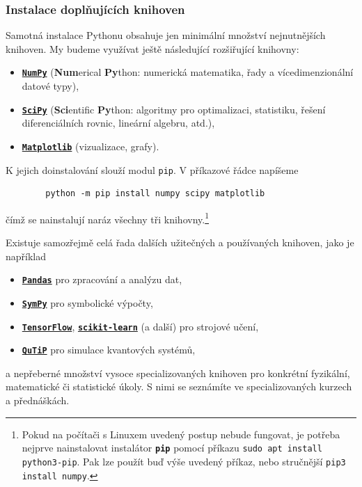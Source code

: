 \documentclass[a4paper,11pt,twoside]{article}
\def\code#1{\textnormal{\texttt{#1}}}
\def\file#1{\textnormal{\textbf{\texttt{#1}}}}
\theoremstyle{red}
\theoremstyle{green}
\begin{document}
\subsubsection{Instalace doplňujících knihoven}
\label{sec:pip}
    Samotná instalace Pythonu obsahuje jen minimální množství nejnutnějších knihoven.
    My budeme využívat ještě následující rozšiřující knihovny:
    \begin{itemize}
        \item \file{\href{https://numpy.org}{NumPy}} ({\bf Num}erical {\bf Py}thon: numerická matematika, řady a vícedimenzionální datové typy),
        \item \file{\href{https://scipy.org}{SciPy}} ({\bf Sci}entific {\bf Py}thon: algoritmy pro optimalizaci, statistiku, řešení diferenciálních rovnic, lineární algebru, atd.),
        \item \file{\href{https://matplotlib.org}{Matplotlib}} (vizualizace, grafy).
    \end{itemize}
    K jejich doinstalování slouží modul \code{pip}.
    V příkazové řádce napíšeme
    \begin{lstlisting}
        python -m pip install numpy scipy matplotlib\end{lstlisting}
    čímž se nainstalují naráz všechny tři knihovny.\footnote{
        Pokud na počítači s Linuxem uvedený postup nebude fungovat, je potřeba nejprve nainstalovat instalátor \file{pip} pomocí příkazu \code{sudo apt install python3-pip}.
        Pak lze použít buď výše uvedený příkaz, nebo stručnější \code{pip3 install numpy}.
    }
    
    Existuje samozřejmě celá řada dalších užitečných a používaných knihoven, jako je například 
    \begin{itemize}
        \item \file{\href{https://pandas.pydata.org/}{Pandas}} pro zpracování a analýzu dat,
        \item \file{\href{https://www.sympy.org/}{SymPy}} pro symbolické výpočty,
        \item \file{\href{https://www.tensorflow.org/}{TensorFlow}}, 
            \file{\href{https://scikit-learn.org}{scikit-learn}} (a další) pro strojové učení,
        \item \file{\href{https://qutip.org/}{QuTiP}} pro simulace kvantových systémů,
    \end{itemize} 
    a nepřeberné množství vysoce specializovaných knihoven pro konkrétní fyzikální, matematické či statistické úkoly.
    S nimi se seznámíte ve specializovaných kurzech a přednáškách.
\end{document}
